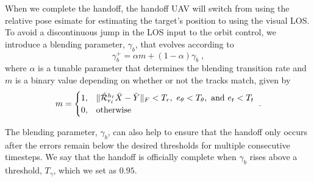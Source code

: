 When we complete the handoff, the handoff UAV will switch from using the relative pose esimate for estimating the target's position to using the visual LOS. To avoid a discontinuous jump in the LOS input to the orbit control, we introduce a blending parameter, $\gamma_b$, that evolves according to
\begin{equation}
    \gamma_b^+ = \alpha m + (1 - \alpha) \gamma_b\;,
\end{equation}
where $\alpha$ is a tunable parameter that determines the blending transition rate and $m$ is a binary value depending on whether or not the tracks match, given by
\begin{equation}
    m = \begin{cases} 1, & \norm{\Rot[\hat]{\tv}{\hv}\bar{X} - \bar{Y}}_F < T_r, \mbox{ } e_\theta < T_\theta, \mbox{ and } e_t < T_t\\
    0, & \mbox{otherwise}
  \end{cases}\;.
\end{equation}

The blending parameter, $\gamma_b$, can also help to ensure that the handoff only occurs after the errors remain below the desired thresholds for multiple consecutive timesteps. We say that the handoff is officially complete when $\gamma_b$ rises above a threshold, $T_\gamma$, which we set as $0.95$.
